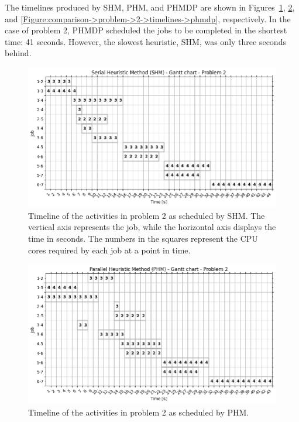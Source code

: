 The timelines produced by SHM, PHM, and PHMDP are shown in Figures~\ref{Figure:comparison->problem->2->timelines->shm}, \ref{Figure:comparison->problem->2->timelines->phm}, and \ref{Figure:comparison->problem->2->timelines->phmdp}, respectively.
In the case of problem 2, PHMDP scheduled the jobs to be completed in the shortest time: 41 seconds.
However, the slowest heuristic, SHM, was only three seconds behind.

\begin{figure}[ht!]
	\centering
	\includegraphics[width=0.8\linewidth]{images/comparison/shm_problem_2.png}
	\caption{Timeline of the activities in problem 2 as scheduled by SHM.
		The vertical axis represents the job, while the horizontal axis displays the time in seconds.
		The numbers in the squares represent the CPU cores required by each job at a point in time.
	}
	\label{Figure:comparison->problem->2->timelines->shm}
\end{figure}

\begin{figure}[ht!]
	\centering
	\includegraphics[width=0.8\linewidth]{images/comparison/phm_problem_2.png}
	\caption{Timeline of the activities in problem 2 as scheduled by PHM.}
	\label{Figure:comparison->problem->2->timelines->phm}
\end{figure}

